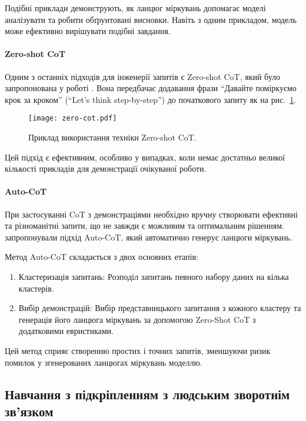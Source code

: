 Подібні приклади демонструють, як ланцюг міркувань допомагає моделі аналізувати та робити обґрунтовані висновки. Навіть з одним прикладом, модель може ефективно вирішувати подібні завдання.

\paragraph{Zero-shot CoT}
Одним з останніх підходів для інженерії запитів є Zero-shot CoT, який було запропонована у роботі \cite{kojima2023largelanguagemodelszeroshot}. Вона передбачає додавання фрази ``Давайте поміркуємо крок за кроком'' (``Let's think step-by-step'') до початкового запиту як на рис.~\ref{fig:zero_cot}.

\begin{figure}
    \centering
    \texttt{[image: zero-cot.pdf]}
    \caption{Приклад використання техніки Zero-shot CoT.}
    \label{fig:zero_cot}
\end{figure}

Цей підхід є ефективним, особливо у випадках, коли немає достатньо великої кількості прикладів для демонстрації очікуваної роботи.

\paragraph{Auto-CoT}
При застосуванні CoT з демонстраціями необхідно вручну створювати ефективні та різноманітні запити, що не завжди є можливим та оптимальним рішенням. \cite{zhang2022automaticchainthoughtprompting} запропонували підхід Auto-CoT, який автоматично генерує ланцюги міркувань.

Метод Auto-CoT складається з двох основних етапів:
\begin{enumerate}
    \item {Кластеризація запитань:} Розподіл запитань певного набору даних на кілька кластерів.
    \item {Вибір демонстрацій:} Вибір представницького запитання з кожного кластеру та генерація його ланцюга міркувань за допомогою Zero-Shot CoT з додатковими евристиками.
\end{enumerate}

Цей метод сприяє створенню простих і точних запитів, зменшуючи ризик помилок у згенерованих ланцюгах міркувань моделлю.

\subsection{Навчання з підкріпленням з людським зворотнім зв'язком}

